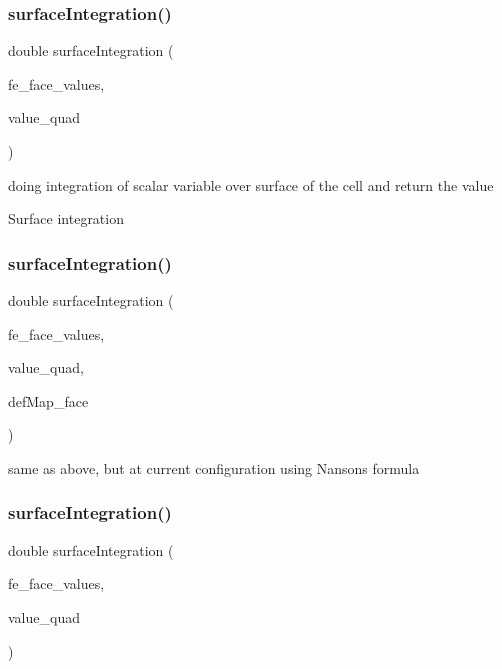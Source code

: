 \mbox{\label{class_residual_ac48cd0a04f0d2f91a23e60135652d938}} 
\subsubsection{\texorpdfstring{surface\+Integration()}{surfaceIntegration()}\hspace{0.1cm}{\footnotesize\ttfamily [1/6]}}
{\footnotesize\ttfamily double surface\+Integration (\begin{DoxyParamCaption}\item[{const F\+E\+Face\+Values$<$ dim $>$ \&}]{fe\+\_\+face\+\_\+values,  }\item[{double}]{value\+\_\+quad }\end{DoxyParamCaption})}

doing integration of scalar variable over surface of the cell and return the value

Surface integration \mbox{\label{class_residual_ad44c10c32c915ba9b431c0256a2769c2}} 
\subsubsection{\texorpdfstring{surface\+Integration()}{surfaceIntegration()}\hspace{0.1cm}{\footnotesize\ttfamily [2/6]}}
{\footnotesize\ttfamily double surface\+Integration (\begin{DoxyParamCaption}\item[{const F\+E\+Face\+Values$<$ dim $>$ \&}]{fe\+\_\+face\+\_\+values,  }\item[{double}]{value\+\_\+quad,  }\item[{\mbox{\hyperlink{structdeformation_map}{deformation\+Map}}$<$ T, dim $>$ \&}]{def\+Map\+\_\+face }\end{DoxyParamCaption})}

same as above, but at current configuration using Nanson\textquotesingle{}s formula \mbox{\label{class_residual_a6753ecdc0e19b7bac24615d47889ae65}} 
\subsubsection{\texorpdfstring{surface\+Integration()}{surfaceIntegration()}\hspace{0.1cm}{\footnotesize\ttfamily [3/6]}}
{\footnotesize\ttfamily double surface\+Integration (\begin{DoxyParamCaption}\item[{const F\+E\+Face\+Values$<$ dim $>$ \&}]{fe\+\_\+face\+\_\+values,  }\item[{dealii\+::\+Table$<$ 1, Sacado\+::\+Fad\+::\+D\+Fad$<$ double $>$ $>$ \&}]{value\+\_\+quad }\end{DoxyParamCaption})}

